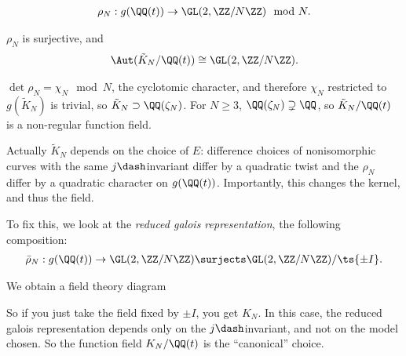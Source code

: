 \begin{align*}  
\rho_N: g(\QQ(t)) \to \GL(2, \ZZ/N\ZZ) \mod N
.\end{align*}

\begin{proposition}

\(\rho_N\) is surjective, and
\begin{align*}  
\Aut(\tilde K_N / \QQ(t))  \cong \GL(2, \ZZ/N\ZZ)
.\end{align*}

\(\det \rho_N = \chi_N \mod N\), the cyclotomic character, and therefore
\(\chi_N\) restricted to \(g(\tilde K_N)\) is trivial, so
\(\tilde K_N \supset \QQ(\zeta_N)\). For \(N\geq 3\),
\(\QQ(\zeta_N) \supsetneq \QQ\), so \(\tilde K_N / \QQ(t)\) is a
non-regular function field.

\end{proposition}

\begin{remark}

Actually \(\tilde K_N\) depends on the choice of \(E\): difference
choices of nonisomorphic curves with the same \(j\dash\)invariant differ
by a quadratic twist and the \(\rho_N\) differ by a quadratic character
on \(g(\QQ(t))\). Importantly, this changes the kernel, and thus the
field.

\end{remark}

To fix this, we look at the \emph{reduced galois representation}, the
following composition:
\begin{align*}  
\bar \rho_N: g(\QQ(t)) \to \GL(2, \ZZ/N\ZZ) \surjects \GL(2, \ZZ/N\ZZ)/\ts{\pm I}
.\end{align*}

We obtain a field theory diagram

\begin{center}
\end{center}

So if you just take the field fixed by \(\pm I\), you get \(K_N\). In
this case, the reduced galois representation depends only on the
\(j\dash\)invariant, and not on the model chosen. So the function field
\(K_N/\QQ(t)\) is the ``canonical'' choice.

